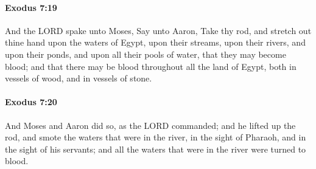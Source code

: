 		\paragraph{Exodus 7:19} %
			\label{EXODUS-7-19}

			And the LORD spake unto Moses, Say unto Aaron, Take thy rod, and stretch out thine hand upon the waters of Egypt, upon their streams, upon their rivers, and upon their ponds, and upon all their pools of water, that they may become blood; and that there may be blood throughout all the land of Egypt, both in vessels of wood, and in vessels of stone.


		\paragraph{Exodus 7:20} %
			\label{EXODUS-7-20}

			And Moses and Aaron did so, as the LORD commanded; and he lifted up the rod, and smote the waters that were in the river, in the sight of Pharaoh, and in the sight of his servants; and all the waters that were in the river were turned to blood.

